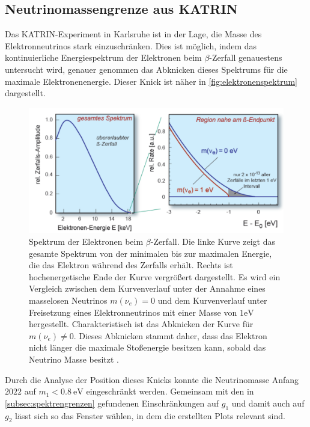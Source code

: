\subsection{Neutrinomassengrenze aus KATRIN}
\label{subsec:KATRIN}

Das KATRIN-Experiment in Karlsruhe ist in der Lage, die Masse des Elektronneutrinos stark einzuschränken.
Dies ist möglich, indem das kontinuierliche Energiespektrum der Elektronen beim $\beta$-Zerfall genauestens untersucht wird, genauer genommen das Abknicken dieses Spektrums für die maximale Elektronenenergie.
Dieser Knick ist näher in \autoref{fig:elektronenspektrum} dargestellt.
\begin{figure}[H]
    \centering
    \includegraphics[width=.5\textwidth]{figures/Elektronenspektrum.pdf}
    \caption{Spektrum der Elektronen beim $\beta$-Zerfall. Die linke Kurve zeigt das gesamte Spektrum von der minimalen bis zur maximalen Energie, die das Elektron während des Zerfalls erhält. Rechts
            ist hochenergetische Ende der Kurve vergrößert dargestellt. Es wird ein Vergleich zwischen dem Kurvenverlauf unter der Annahme eines masselosen Neutrinos $m(\nu_e) = 0$ und dem Kurvenverlauf unter Freisetzung
            eines Elektronneutrinos mit einer Masse von $1 \si{\eV}$ hergestellt. Charakteristisch ist das Abknicken der Kurve für $m(\nu_e) \neq 0$. Dieses Abknicken stammt daher, dass das Elektron nicht länger
            die maximale Stoßenergie besitzen kann, sobald das Neutrino Masse besitzt \cite{elektronenspektrum}.}
    \label{fig:elektronenspektrum}
\end{figure}
Durch die Analyse der Position dieses Knicks konnte die Neutrinomasse Anfang $2022$ auf $m_1 < \SI{0.8}{\eV}$ \cite{KATRINneutrinogrenze} eingeschränkt werden.
Gemeinsam mit den in \autoref{subsec:spektrengrenzen} gefundenen Einschränkungen auf $g_1$ und damit auch auf $g_2$ lässt sich so das Fenster wählen, in dem die erstellten Plots relevant sind.




